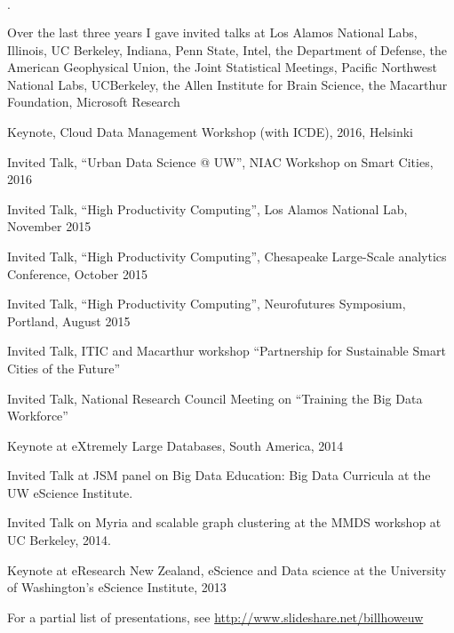 \documentclass[10pt]{article}
\newenvironment{bulletlist}
   {
      \begin{list}
         {$\cdot$}
         {
            \setlength{\itemsep}{.7ex}
            \setlength{\parsep}{0ex}
            \setlength{\leftmargin}{0.7em}
            \setlength{\parskip}{0ex}
            \setlength{\topsep}{0ex}
         }
   }
   {
      \end{list}
   }
\newcommand{\marginlabel}[1]{
\begin{minipage}[b]{0.8\labelwidth}{\large \textsf{\textbf{#1}}}\end{minipage}}
\newcommand{\entrylabel}[1]{\mbox{\marginlabel{#1}}\hfill}
\newcommand{\MainListlabel}[1]
   {
      \parbox[t]{\labelwidth}{\hspace{.8em}\marginlabel{#1}}
   }
\newenvironment{MainList}[1]
   {
      \renewcommand{\entrylabel}{\MainListlabel}
      \begin{list}{}
      {
         \renewcommand{\makelabel}{\entrylabel}
         \setlength   {\itemindent}{-.65em}
         \setlength   {\labelwidth}{#1}
         \setlength   {\leftmargin}{\labelwidth}
         \setlength   {\itemsep}{3ex}
      }
   }
   {
      \end{list}
   }
\begin{document}
\begin{MainList}{88pt}
\begin{bulletlist}
  \item Over the last three years I gave invited
  talks at Los Alamos National Labs, Illinois, UC Berkeley, Indiana, Penn State, Intel, the Department of Defense, 
  the American Geophysical Union, the Joint Statistical Meetings, Pacific Northwest National Labs, UCBerkeley,
  the Allen Institute for Brain Science, the Macarthur Foundation, Microsoft Research
  \item Keynote, Cloud Data Management Workshop (with ICDE), 2016, Helsinki
  \item Invited Talk, “Urban Data Science @ UW”, NIAC Workshop on Smart Cities, 2016
  \item Invited Talk, “High Productivity Computing”, Los Alamos National Lab, November 2015
  \item Invited Talk, “High Productivity Computing”, Chesapeake Large-Scale analytics Conference, October 2015
  \item Invited Talk, “High Productivity Computing”, Neurofutures Symposium, Portland, August 2015
  \item Invited Talk, ITIC and Macarthur workshop ``Partnership for Sustainable Smart Cities of the Future''
  \item Invited Talk, National Research Council Meeting on ``Training the Big Data Workforce''
  \item Keynote at eXtremely Large Databases, South America, 2014
  \item Invited Talk at JSM panel on Big Data Education: Big Data Curricula at the UW eScience Institute.
  \item Invited Talk on Myria and scalable graph clustering at the MMDS workshop at UC Berkeley, 2014.
  \item Keynote at eResearch New Zealand, eScience and Data science at the University of Washington's eScience Institute, 2013
  \item For a partial list of presentations, see \url{http://www.slideshare.net/billhoweuw}
\end{bulletlist}



\end{MainList}
\end{document}
